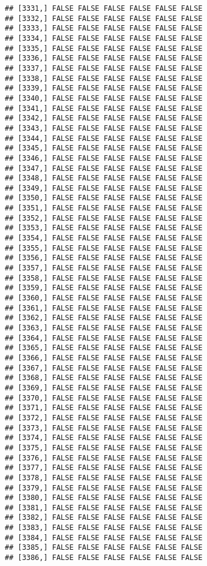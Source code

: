 \documentclass[
]{article}
\begin{document}
\begin{verbatim}
## [3331,] FALSE FALSE FALSE FALSE FALSE FALSE
## [3332,] FALSE FALSE FALSE FALSE FALSE FALSE
## [3333,] FALSE FALSE FALSE FALSE FALSE FALSE
## [3334,] FALSE FALSE FALSE FALSE FALSE FALSE
## [3335,] FALSE FALSE FALSE FALSE FALSE FALSE
## [3336,] FALSE FALSE FALSE FALSE FALSE FALSE
## [3337,] FALSE FALSE FALSE FALSE FALSE FALSE
## [3338,] FALSE FALSE FALSE FALSE FALSE FALSE
## [3339,] FALSE FALSE FALSE FALSE FALSE FALSE
## [3340,] FALSE FALSE FALSE FALSE FALSE FALSE
## [3341,] FALSE FALSE FALSE FALSE FALSE FALSE
## [3342,] FALSE FALSE FALSE FALSE FALSE FALSE
## [3343,] FALSE FALSE FALSE FALSE FALSE FALSE
## [3344,] FALSE FALSE FALSE FALSE FALSE FALSE
## [3345,] FALSE FALSE FALSE FALSE FALSE FALSE
## [3346,] FALSE FALSE FALSE FALSE FALSE FALSE
## [3347,] FALSE FALSE FALSE FALSE FALSE FALSE
## [3348,] FALSE FALSE FALSE FALSE FALSE FALSE
## [3349,] FALSE FALSE FALSE FALSE FALSE FALSE
## [3350,] FALSE FALSE FALSE FALSE FALSE FALSE
## [3351,] FALSE FALSE FALSE FALSE FALSE FALSE
## [3352,] FALSE FALSE FALSE FALSE FALSE FALSE
## [3353,] FALSE FALSE FALSE FALSE FALSE FALSE
## [3354,] FALSE FALSE FALSE FALSE FALSE FALSE
## [3355,] FALSE FALSE FALSE FALSE FALSE FALSE
## [3356,] FALSE FALSE FALSE FALSE FALSE FALSE
## [3357,] FALSE FALSE FALSE FALSE FALSE FALSE
## [3358,] FALSE FALSE FALSE FALSE FALSE FALSE
## [3359,] FALSE FALSE FALSE FALSE FALSE FALSE
## [3360,] FALSE FALSE FALSE FALSE FALSE FALSE
## [3361,] FALSE FALSE FALSE FALSE FALSE FALSE
## [3362,] FALSE FALSE FALSE FALSE FALSE FALSE
## [3363,] FALSE FALSE FALSE FALSE FALSE FALSE
## [3364,] FALSE FALSE FALSE FALSE FALSE FALSE
## [3365,] FALSE FALSE FALSE FALSE FALSE FALSE
## [3366,] FALSE FALSE FALSE FALSE FALSE FALSE
## [3367,] FALSE FALSE FALSE FALSE FALSE FALSE
## [3368,] FALSE FALSE FALSE FALSE FALSE FALSE
## [3369,] FALSE FALSE FALSE FALSE FALSE FALSE
## [3370,] FALSE FALSE FALSE FALSE FALSE FALSE
## [3371,] FALSE FALSE FALSE FALSE FALSE FALSE
## [3372,] FALSE FALSE FALSE FALSE FALSE FALSE
## [3373,] FALSE FALSE FALSE FALSE FALSE FALSE
## [3374,] FALSE FALSE FALSE FALSE FALSE FALSE
## [3375,] FALSE FALSE FALSE FALSE FALSE FALSE
## [3376,] FALSE FALSE FALSE FALSE FALSE FALSE
## [3377,] FALSE FALSE FALSE FALSE FALSE FALSE
## [3378,] FALSE FALSE FALSE FALSE FALSE FALSE
## [3379,] FALSE FALSE FALSE FALSE FALSE FALSE
## [3380,] FALSE FALSE FALSE FALSE FALSE FALSE
## [3381,] FALSE FALSE FALSE FALSE FALSE FALSE
## [3382,] FALSE FALSE FALSE FALSE FALSE FALSE
## [3383,] FALSE FALSE FALSE FALSE FALSE FALSE
## [3384,] FALSE FALSE FALSE FALSE FALSE FALSE
## [3385,] FALSE FALSE FALSE FALSE FALSE FALSE
## [3386,] FALSE FALSE FALSE FALSE FALSE FALSE

\end{verbatim}
\end{document}
